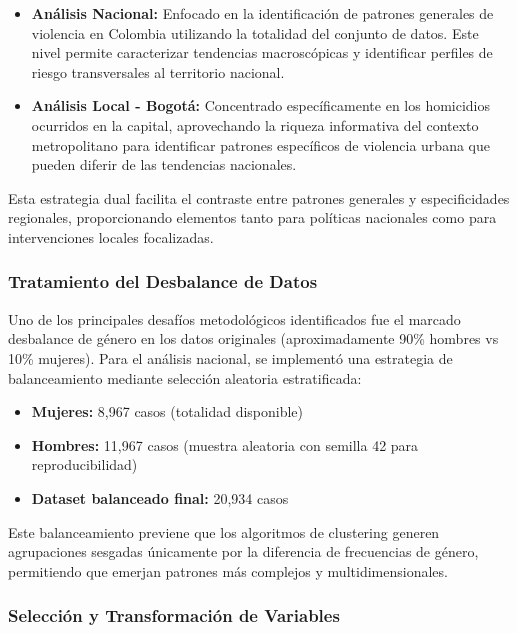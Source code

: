\documentclass[lettersize,journal]{IEEEtran}
\begin{document}
\begin{itemize}
    \item \textbf{Análisis Nacional:} Enfocado en la identificación de patrones generales de violencia en Colombia utilizando la totalidad del conjunto de datos. Este nivel permite caracterizar tendencias macroscópicas y identificar perfiles de riesgo transversales al territorio nacional.
    
    \item \textbf{Análisis Local - Bogotá:} Concentrado específicamente en los homicidios ocurridos en la capital, aprovechando la riqueza informativa del contexto metropolitano para identificar patrones específicos de violencia urbana que pueden diferir de las tendencias nacionales.
\end{itemize}

Esta estrategia dual facilita el contraste entre patrones generales y especificidades regionales, proporcionando elementos tanto para políticas nacionales como para intervenciones locales focalizadas.

\subsubsection{Tratamiento del Desbalance de Datos}
Uno de los principales desafíos metodológicos identificados fue el marcado desbalance de género en los datos originales (aproximadamente 90\% hombres vs 10\% mujeres). Para el análisis nacional, se implementó una estrategia de balanceamiento mediante selección aleatoria estratificada:

\begin{itemize}
    \item \textbf{Mujeres:} 8,967 casos (totalidad disponible)
    \item \textbf{Hombres:} 11,967 casos (muestra aleatoria con semilla 42 para reproducibilidad)
    \item \textbf{Dataset balanceado final:} 20,934 casos
\end{itemize}

Este balanceamiento previene que los algoritmos de clustering generen agrupaciones sesgadas únicamente por la diferencia de frecuencias de género, permitiendo que emerjan patrones más complejos y multidimensionales.

\subsubsection{Selección y Transformación de Variables}
\end{document}

